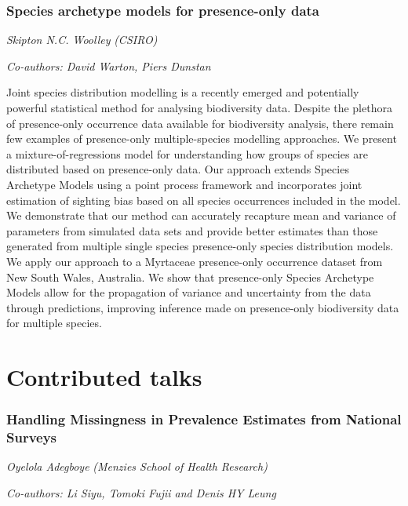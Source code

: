 \documentclass[
]{scrreprt}
\begin{document}
\subsection{Species archetype models for presence-only
data}\label{species-archetype-models-for-presence-only-data}

\emph{Skipton N.C. Woolley} \emph{(CSIRO)}

\emph{Co-authors: David Warton, Piers Dunstan}

\setlength{\parskip}{0.5em}

Joint species distribution modelling is a recently emerged and
potentially powerful statistical method for analysing biodiversity data.
Despite the plethora of presence-only occurrence data available for
biodiversity analysis, there remain few examples of presence-only
multiple-species modelling approaches. We present a
mixture-of-regressions model for understanding how groups of species are
distributed based on presence-only data. Our approach extends Species
Archetype Models using a point process framework and incorporates joint
estimation of sighting bias based on all species occurrences included in
the model. We demonstrate that our method can accurately recapture mean
and variance of parameters from simulated data sets and provide better
estimates than those generated from multiple single species
presence-only species distribution models. We apply our approach to a
Myrtaceae presence-only occurrence dataset from New South Wales,
Australia. We show that presence-only Species Archetype Models allow for
the propagation of variance and uncertainty from the data through
predictions, improving inference made on presence-only biodiversity data
for multiple species.

\chapter{Contributed talks}\label{contributed-talks}

\subsection{Handling Missingness in Prevalence Estimates from National
Surveys}\label{handling-missingness-in-prevalence-estimates-from-national-surveys}

\emph{Oyelola Adegboye} \emph{(Menzies School
of Health Research)}

\emph{Co-authors: Li Siyu, Tomoki Fujii and Denis HY Leung}
\end{document}

